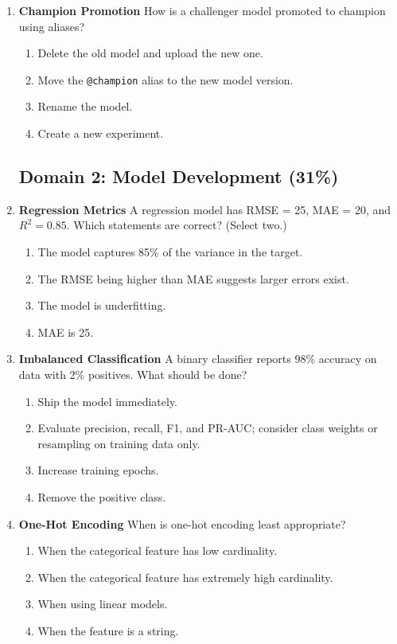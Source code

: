 \documentclass{article}
\begin{document}
\begin{enumerate}[label=\textbf{Q\arabic*.}]
		\item \textbf{Champion Promotion}
		How is a challenger model promoted to champion using aliases?
		\begin{enumerate}[label=\Alph*.]
			\item Delete the old model and upload the new one.
			\item Move the \texttt{@champion} alias to the new model version.
			\item Rename the model.
			\item Create a new experiment.
		\end{enumerate}
		
		\subsection*{Domain 2: Model Development (31\%)}
		
		\item \textbf{Regression Metrics}
		A regression model has RMSE = 25, MAE = 20, and $R^2 = 0.85$. Which statements are correct? (Select two.)
		\begin{enumerate}[label=\Alph*.]
			\item The model captures 85\% of the variance in the target.
			\item The RMSE being higher than MAE suggests larger errors exist.
			\item The model is underfitting.
			\item MAE is 25.
		\end{enumerate}
		
		\item \textbf{Imbalanced Classification}
		A binary classifier reports 98\% accuracy on data with 2\% positives. What should be done?
		\begin{enumerate}[label=\Alph*.]
			\item Ship the model immediately.
			\item Evaluate precision, recall, F1, and PR-AUC; consider class weights or resampling on training data only.
			\item Increase training epochs.
			\item Remove the positive class.
		\end{enumerate}
		
		\item \textbf{One-Hot Encoding}
		When is one-hot encoding least appropriate?
		\begin{enumerate}[label=\Alph*.]
			\item When the categorical feature has low cardinality.
			\item When the categorical feature has extremely high cardinality.
			\item When using linear models.
			\item When the feature is a string.
		\end{enumerate}
		

\end{enumerate}
\end{document}
